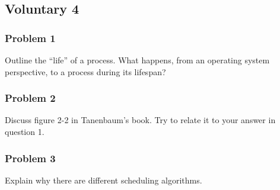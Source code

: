 
\subsection*{Voluntary 4}

\subsubsection*{Problem 1}
Outline the ``life'' of a process. What happens, from an operating system perspective, to a process during its lifespan?



\subsubsection*{Problem 2}
Discuss figure 2-2 in Tanenbaum's book. Try to relate it to your answer in question 1.

\subsubsection*{Problem 3}
Explain why there are different scheduling algorithms.
